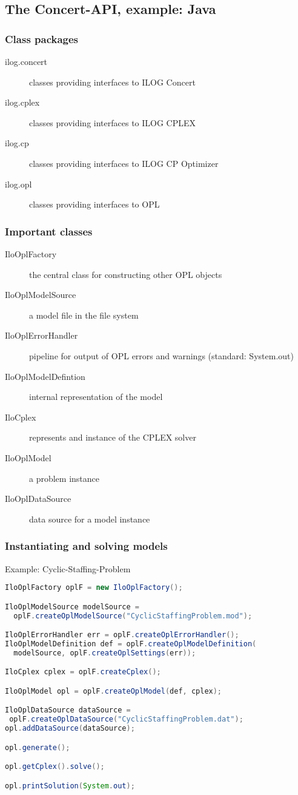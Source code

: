 \subsection{The Concert-API, example: Java}
\begin{frame}
 \frametitle{Class packages}
 \begin{description}
  \item[ilog.concert] classes providing interfaces to ILOG Concert
  \item[ilog.cplex] classes providing interfaces to ILOG CPLEX
  \item[ilog.cp] classes providing interfaces to ILOG CP Optimizer
  \item[ilog.opl] classes providing interfaces to OPL
 \end{description}
\end{frame}

\begin{frame}
 \frametitle{Important classes}
 \begin{description}
  \item[IloOplFactory] the central class for constructing other OPL objects
  \item[IloOplModelSource] a model file in the file system
  \item[IloOplErrorHandler] pipeline for output of OPL errors and warnings (standard: System.out)
  \item[IloOplModelDefintion] internal representation of the model 
  \item[IloCplex] represents and instance of the CPLEX solver
  \item[IloOplModel] a problem instance
  \item[IloOplDataSource] data source for a model instance
 \end{description}
\end{frame}

\begin{frame}[fragile]
 \frametitle{Instantiating and solving models}
 \begin{block}{Example: Cyclic-Staffing-Problem}
\begin{lstlisting}[language=java,numbers=none,basicstyle=\tiny\ttfamily]
IloOplFactory oplF = new IloOplFactory();

IloOplModelSource modelSource =
  oplF.createOplModelSource("CyclicStaffingProblem.mod");

IloOplErrorHandler err = oplF.createOplErrorHandler();
IloOplModelDefinition def = oplF.createOplModelDefinition(
  modelSource, oplF.createOplSettings(err));

IloCplex cplex = oplF.createCplex();

IloOplModel opl = oplF.createOplModel(def, cplex);

IloOplDataSource dataSource =
 oplF.createOplDataSource("CyclicStaffingProblem.dat");
opl.addDataSource(dataSource);

opl.generate();

opl.getCplex().solve();

opl.printSolution(System.out);
\end{lstlisting}
 \end{block}
\end{frame}


